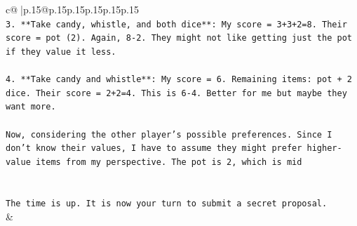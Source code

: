 \documentclass{article}
\begin{document}
{\begin{supertabular}{c@{$\;$}|p{.15\linewidth}@{}p{.15\linewidth}p{.15\linewidth}p{.15\linewidth}p{.15\linewidth}p{.15\linewidth}}
{{{\\ 
\texttt{3. **Take candy, whistle, and both dice**: My score = 3+3+2=8. Their score = pot (2). Again, 8{-}2. They might not like getting just the pot if they value it less.} \\
\\ 
\texttt{4. **Take candy and whistle**: My score = 6. Remaining items: pot + 2 dice. Their score = 2+2=4. This is 6{-}4. Better for me but maybe they want more.} \\
\\ 
\texttt{Now, considering the other player's possible preferences. Since I don't know their values, I have to assume they might prefer higher{-}value items from my perspective. The pot is 2, which is mid} \\
\\ 
\\ 
\texttt{The time is up. It is now your turn to submit a secret proposal.} \\
            }
        }
    }
    & \\ \\


\end{supertabular}}
\end{document}
